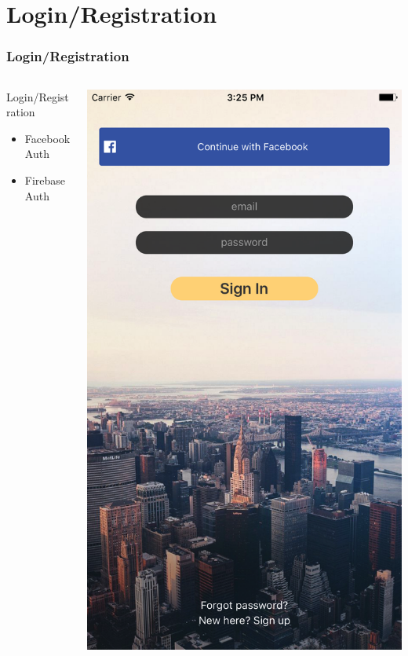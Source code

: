 \documentclass{beamer}
\begin{document}
\section{Login/Registration}
\begin{frame}
\frametitle{Login/Registration}
\begin{columns}
    \begin{column}{0.3\textwidth}
        Login/Registration
        \begin{itemize}
            \item Facebook Auth
            \item Firebase Auth
        \end{itemize}
    \end{column}
    \begin{column}{0.3\textwidth}  %
        \begin{center}
            \includegraphics[scale=0.08]{login}

\end{center}
\end{column}
\end{columns}
\end{frame}
\end{document}
